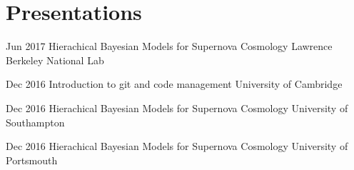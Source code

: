 \section{Presentations}
\begin{entrylist}
\end{entrylist}
\begin{entrylist}
\end{entrylist}
\begin{entrylist}
\end{entrylist}
\begin{entrylist}
\end{entrylist}
\begin{entrylist}
\end{entrylist}
\begin{entrylist}
\end{entrylist}
\begin{entrylist}
\end{entrylist}
\begin{entrylist}
\end{entrylist}
\begin{entrylist}
	\entryInlineSmall
	{Jun 2017}
	{Hierachical Bayesian Models for Supernova Cosmology}
	{Lawrence Berkeley National Lab}
	{}
\end{entrylist}
\begin{entrylist}
	\entryInlineSmall
	{Dec 2016}
	{Introduction to git and code management}
	{University of Cambridge}
	{}
\end{entrylist}
\begin{entrylist}
	\entryInlineSmall
	{Dec 2016}
	{Hierachical Bayesian Models for Supernova Cosmology}
	{University of Southampton}
	{}
\end{entrylist}
\begin{entrylist}
	\entryInlineSmall
	{Dec 2016}
	{Hierachical Bayesian Models for Supernova Cosmology}
	{University of Portsmouth}
	{}
\end{entrylist}
